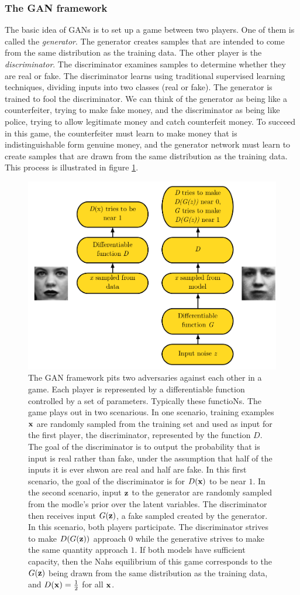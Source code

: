\subsubsection{The GAN framework}
The basic idea of GANs is to set up a game between two players. One of them is called the \emph{generator}. The generator creates samples that are intended to come from the same distribution as the training data. The other player is the \emph{discriminator}. The discriminator examines samples to determine whether they are real or fake. The discriminator learns using traditional supervised learning techniques, dividing inputs into two classes (real or fake). The generator is trained to fool the discriminator. We can think of the generator as being like a counterfeiter, trying to make fake money, and the discriminator as being like police, trying to allow legitimate money and catch counterfeit money. To succeed in this game, the counterfeiter must learn to make money that is indistinguishable form genuine money, and the generator network must learn to create samples that are drawn from the same distribution as the training data. This process is illustrated in figure \ref{fig:gan1}.\\
\begin{figure}[h!]
	\centering
	\includegraphics[width=0.7\linewidth]{gfx/gan1}
	\caption{The GAN framework pits two adversaries against each other in a game. Each player is represented by a differentiable function controlled by a set of parameters. Typically  these functioNs. The game plays out in two scenarious. In one scenario, training examples $\mathbf{x}$ are randomly sampled from the training set and used as input for the first player, the discriminator, represented by the function $D$. The goal of the discriminator is to output the probability that is input is real rather than fake, under the assumption that half of the inputs it is ever shwon are real and half are fake. In this first scenario, the goal of the discriminator is for $D(\mathbf{x})$ to be near $1$. In the second scenario, input $\mathbf{z}$ to the generator are randomly sampled from the modle's prior over the latent variables. The discriminator then receives input $G(\mathbf{z})$, a fake sampled created by the generator. In this scenario, both players participate. The discriminator strives to make $D(G(\mathbf{z}))$ approach $0$ while the generative strives to make the same quantity approach $1$. If both models have sufficient capacity, then the Nahs equilibrium of this game corresponds to the $G(\mathbf{z})$ being drawn from the same distribution as the training data, and $D(\mathbf{x})=\frac{1}{2}$ for all $\mathbf{x}$.}
	\label{fig:gan1}
\end{figure}
